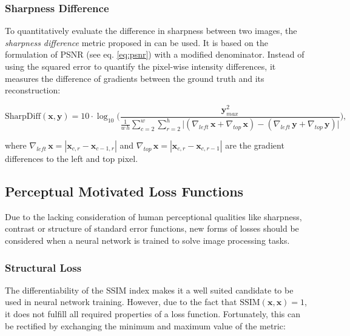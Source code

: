 \subsubsection*{Sharpness Difference}

To quantitatively evaluate the difference in sharpness between two images, the \textit{sharpness difference} metric proposed in \parencite{deep_multiscale_video_pred} can be used. It is based on the formulation of PSNR (see eq. \ref{eq:psnr}) with a modified denominator. Instead of using the squared error to quantify the pixel-wise intensity differences, it measures the difference of gradients between the ground truth and its reconstruction:

\begin{equation} \label{eq:sharpdiff}
\textrm{SharpDiff}(\textbf{x}, \textbf{y}) = 10 \cdot \log_{10} \Bigg( \frac{\textbf{y}_{max}^2}{\frac{1}{w \, h} \sum_{c=2}^{w} \sum_{r=2}^{h} \big|(\nabla_{left} \, \textbf{x} + \nabla_{top} \, \textbf{x})-(\nabla_{left} \, \textbf{y} + \nabla_{top} \, \textbf{y})\big|} \Bigg) ,
\end{equation}

where $ \nabla_{left} \, \textbf{x} = |\textbf{x}_{c,r} - \textbf{x}_{c-1, r}| $ and $ \nabla_{top} \, \textbf{x} = |\textbf{x}_{c,r} - \textbf{x}_{c, r-1}| $ are the gradient differences to the left and top pixel.

\subsection{Perceptual Motivated Loss Functions} \label{sec:perc-loss}

Due to the lacking consideration of human perceptional qualities like sharpness, contrast or structure of standard error functions, new forms of losses should be considered when a neural network is trained to solve image processing tasks.

\subsubsection*{Structural Loss}

The differentiability of the SSIM index makes it a well suited candidate to be used in neural network training. However, due to the fact that $ \textrm{SSIM}(\textbf{x}, \textbf{x}) = 1 $, it does not fulfill all required properties of a loss function. Fortunately, this can be rectified by exchanging the minimum and maximum value of the metric:

